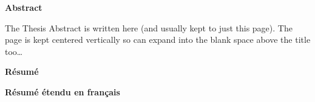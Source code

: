 
\checktoopen
{}
\begin{center}
\textbf{Abstract}
\end{center}
The Thesis Abstract is written here (and usually kept to just this page). The page is kept centered vertically so can expand into the blank space above the title too\ldots



\checktoopen
{}
\begin{center}
\textbf{Résumé}
\end{center}



\checktoopen
{}
\begin{huge}
\textbf{Résumé étendu en français}
\end{huge}
